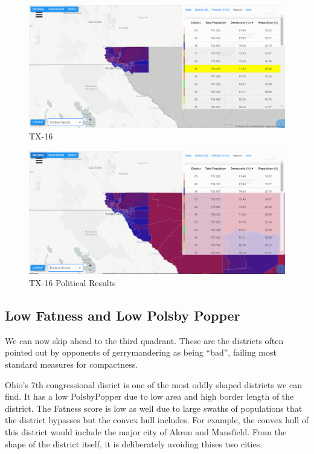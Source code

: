 \documentclass[letterpaper]{article}
\begin{document}
\begin{figure}[H]
	\includegraphics[width=\linewidth]{./figures/TX-16.png}
	\caption{TX-16}
	\label{fig:tx16border}
\end{figure}

\begin{figure}[H]
	\includegraphics[width=\linewidth]{./figures/TX-16-SurroundingArea.png}
	\caption{TX-16 Political Results}
	\label{fig:tx16political}
\end{figure}

\subsection{Low Fatness and Low Polsby Popper}
We can now skip ahead to the third quadrant. These are the districts often pointed out by opponents of gerrymandering as being “bad”, failing most standard measures for compactness.

Ohio's 7th congressional disrict is one of the most oddly shaped districts we can find. It has a low PolsbyPopper due to low area and high border length of the district. The Fatness score is low as well due to large swaths of populations that the district bypasses but the convex hull includes. For example, the convex hull of this district would include the major city of Akron and Mansfield. From the shape of the district itself, it is deliberately avoiding thises two cities.
\end{document}

